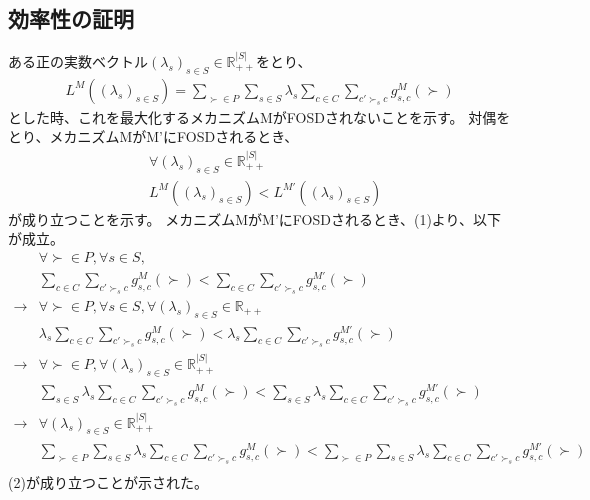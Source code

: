 \documentclass{article}
\theoremstyle{definition}
\begin{document}
\subsection*{効率性の証明}
ある正の実数ベクトル$(\lambda_s)_{s \in S} \in \mathbb{R}_{++}^{|S|}$をとり、
\begin{align*}
L^M((\lambda_s)_{s \in S}) = \sum_{\succ \in P}\sum_{s \in S} \lambda_s \sum_{c \in C} \sum_{c' \succ_s c} g^M_{s,c}(\succ)
\end{align*}
とした時、これを最大化するメカニズムMがFOSDされないことを示す。
対偶をとり、メカニズムMがM'にFOSDされるとき、
\begin{equation}
\begin{aligned}
    &\forall (\lambda_s)_{s \in S}\in \mathbb{R}_{++}^{|S|}\\ 
    &L^M((\lambda_s)_{s \in S}) < L^{M'}((\lambda_s)_{s \in S})
\end{aligned}
\end{equation}
が成り立つことを示す。
メカニズムMがM'にFOSDされるとき、(1)より、以下が成立。
\begin{align*}
    &\forall \succ \in P, \forall s \in S,\\
    &\sum_{c \in C} \sum_{c' \succ_s c} g^M_{s,c}(\succ) < \sum_{c \in C}\sum_{c' \succ_s c} g^{M'}_{s,c}(\succ)\\
    \rightarrow
    &\forall \succ \in P,\forall s \in S,\forall (\lambda_s)_{s \in S} \in \mathbb{R}_{++}\\
    &\lambda_s \sum_{c \in C} \sum_{c' \succ_s c} g^M_{s,c}(\succ) < \lambda_s \sum_{c \in C}\sum_{c' \succ_s c} g^{M'}_{s,c}(\succ)\\
    \rightarrow
    &\forall \succ \in P,\forall (\lambda_s)_{s \in S} \in \mathbb{R}_{++}^{|S|}\\
    &\sum_{s \in S}\lambda_s \sum_{c \in C} \sum_{c' \succ_s c} g^M_{s,c}(\succ) < \sum_{s \in S}\lambda_s \sum_{c \in C}\sum_{c' \succ_s c} g^{M'}_{s,c}(\succ)\\
    \rightarrow
    &\forall (\lambda_s)_{s \in S} \in \mathbb{R}_{++}^{|S|}\\
    &\sum_{\succ \in P}\sum_{s \in S}\lambda_s \sum_{c \in C} \sum_{c' \succ_s c} g^M_{s,c}(\succ) < \sum_{\succ \in P}\sum_{s \in S}\lambda_s \sum_{c \in C}\sum_{c' \succ_s c} g^{M'}_{s,c}(\succ)\\
\end{align*}
(2)が成り立つことが示された。
\end{document}
